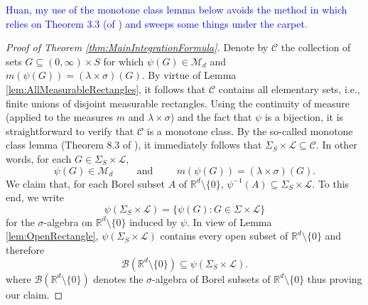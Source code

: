 \documentclass[11pt]{article}
\theoremstyle{theorem}
\begin{document}
\noindent\textcolor{blue}{Huan, my use of the monotone class lemma below avoids the method in \cite{Stein2005} which relies on Theorem 3.3 (of \cite{Stein2005}) and sweeps some things under the carpet.}

\begin{proof}[Proof of Theorem \ref{thm:MainIntegrationFormula}]
Denote by $\mathcal{C}$ the collection of sets $G\subseteq (0,\infty)\times S$ for which $\psi(G)\in \mathcal{M}_d$ and $m(\psi(G))=(\lambda\times\sigma)(G).$ By virtue of Lemma \ref{lem:AllMeasurableRectangles}, it follows that $\mathcal{C}$ contains all elementary sets, i.e., finite unions of disjoint measurable rectangles. Using the continuity of measure (applied to the measures $m$ and $\lambda\times\sigma$) and the fact that $\psi$ is a bijection, it is straightforward to verify that $\mathcal{C}$ is a monotone class. By the so-called monotone class lemma (Theorem 8.3 of \cite{Rudin1987}), it immediately follows that $\Sigma_S\times\mathcal{L}\subseteq\mathcal{C}$. In other words, for each $G\in\Sigma_S\times\mathcal{L}$,
\begin{equation}\label{eq:Good1}
\psi(G)\in\mathcal{M}_d\hspace{1cm}\mbox{and}\hspace{1cm}m(\psi(G))=(\lambda\times\sigma)(G).
\end{equation}
We claim that, for each Borel subset $A$ of $\mathbb{R}^d\setminus\{0\}$, $\psi^{-1}(A)\subseteq \Sigma_S\times \mathcal{L}$. To this end, we write
\begin{equation*}
\psi(\Sigma_S\times\mathcal{L})=\{\psi(G):G\in\Sigma\times \mathcal{L}\}
\end{equation*}
for the $\sigma$-algebra on $\mathbb{R}^d\setminus\{0\}$ induced by $\psi$. In view of Lemma \ref{lem:OpenRectangle}, $\psi(\Sigma_S\times\mathcal{L})$ contains every open subset of $\mathbb{R}^d\setminus\{0\}$ and therefore
\begin{equation*}
\mathcal{B}(\mathbb{R}^d\setminus\{0\})\subseteq\psi(\Sigma_S\times\mathcal{L}).
\end{equation*}
where $\mathcal{B}(\mathbb{R}^d\setminus\{0\})$ denotes the $\sigma$-algebra of Borel subsets of $\mathbb{R}^d\setminus\{0\}$ thus proving our claim. 


\end{proof}
\end{document}

